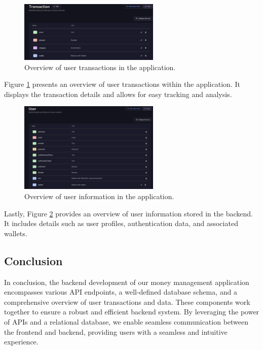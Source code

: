 \begin{figure}[htbp]
  \centering
  \includegraphics[width=0.6\textwidth]{Strapi/TranOverview.png}
  \caption{Overview of user transactions in the application.}
  \label{fig:transaction_overview}
\end{figure}

Figure \ref{fig:transaction_overview} presents an overview of user transactions within the application. It displays the transaction details and allows for easy tracking and analysis.

\begin{figure}[htbp]
  \centering
  \includegraphics[width=0.6\textwidth]{Strapi/UserOverView.png}
  \caption{Overview of user information in the application.}
  \label{fig:user_overview}
\end{figure}

Lastly, Figure \ref{fig:user_overview} provides an overview of user information stored in the backend. It includes details such as user profiles, authentication data, and associated wallets.

\subsection{Conclusion}
In conclusion, the backend development of our money management application encompasses various API endpoints, a well-defined database schema, and a comprehensive overview of user transactions and data. These components work together to ensure a robust and efficient backend system. By leveraging the power of APIs and a relational database, we enable seamless communication between the frontend and backend, providing users with a seamless and intuitive experience.


